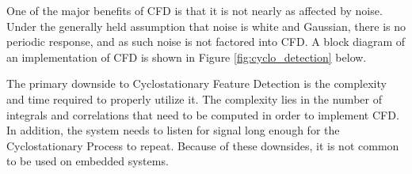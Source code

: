One of the major benefits of CFD is that it is not nearly as affected by noise. Under the generally held assumption that noise is white and Gaussian, there is no periodic response, and as such noise is not factored into CFD. A block diagram of an implementation of CFD is shown in Figure \ref{fig:cyclo_detection} below. \par

The primary downside to Cyclostationary Feature Detection is the complexity and time required to properly utilize it. The complexity lies in the number of integrals and correlations that need to be computed in order to implement CFD. In addition, the system needs to listen for signal long enough for the Cyclostationary Process to repeat. Because of these downsides, it is not common to be used on embedded systems. \par


